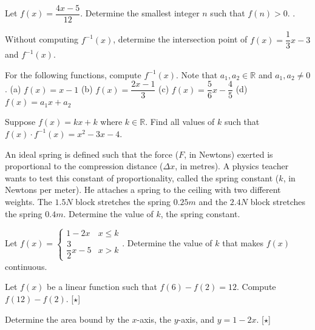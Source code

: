 \documentclass[lang=en,11pt]{elegantbook}
\begin{document}
\begin{reviewset}
\item Let $f(x)=\dfrac{4x-5}{12}$.  Determine the smallest integer $n$ such that $f(n)>0$.  \vspace{2mm}.

\item Without computing $f^{-1}(x)$, determine the intersection point of $f(x)=\dfrac{1}{3}x-3$ and $f^{-1}(x)$.  \vspace{3mm}

\item For the following functions, compute $f^{-1}(x)$.  Note that $a_1,a_2\in\mathbb{R}$ and $a_1,a_2\neq 0$.  \newline 
(a) $f(x)=x-1$ \hspace{50mm} (b) $f(x)=\dfrac{2x-1}{3}$\newline 
(c) $f(x)=\dfrac{5}{6}x-\dfrac{4}{5}$\hspace{47mm} (d) $f(x)=a_1x+a_2$ \vspace{3mm}

\item Suppose $f(x)=kx+k$ where $k\in\mathbb{R}$.  Find all values of $k$ such that $f(x)\cdot f^{-1}(x)=x^2-3x-4$.  \vspace{3mm}

\item An ideal spring is defined such that the force ($F$, in Newtons) exerted is proportional to the compression distance ($\Delta x$, in metres).  A physics teacher wants to test this constant of proportionality, called the spring constant ($k$, in Newtons per meter).  He attaches a spring to the ceiling with two different weights.  The $1.5N$ block stretches the spring $0.25m$ and the $2.4N$ block stretches the spring $0.4m$.  Determine the value of $k$, the spring constant.  \vspace{3mm}

\item Let $f(x)=\begin{cases} 1-2x & x \leq k \\ \dfrac{3}{2}x-5 & x > k \end{cases}$.  Determine the value of $k$ that makes $f(x)$ continuous.  \vspace{3mm}

\item Let $f(x)$ be a linear function such that $f(6)-f(2)=12$.  Compute $f(12)-f(2)$.  [$\star$] \vspace{1mm}

\item Determine the area bound by the $x$-axis, the $y$-axis, and $y=1-2x$.  [$\star$]
\end{reviewset}
\end{document}
